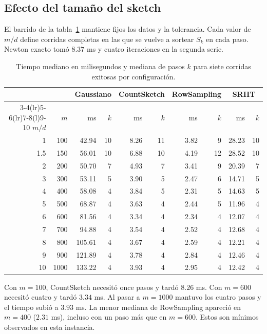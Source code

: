 \documentclass[11pt,a4paper]{article}
\begin{document}
\subsection{Efecto del tamaño del sketch}
El barrido de la tabla~\ref{tab:barrido} mantiene fijos los datos y la tolerancia. Cada valor de $m/d$ define corridas completas en las que se vuelve a sortear $S_k$ en cada paso. Newton exacto tomó $8.37$ ms y cuatro iteraciones en la segunda serie.
\begin{table}[htbp]\centering\small
\caption{Tiempo mediano en milisegundos y mediana de pasos $k$ para siete corridas exitosas por configuración.}\label{tab:barrido}
\begin{tabular}{@{}rr rr rr rr rr@{}}\toprule
& &\multicolumn{2}{c}{Gaussiano}&\multicolumn{2}{c}{CountSketch}&
\multicolumn{2}{c}{RowSampling}&\multicolumn{2}{c}{SRHT}\\
\cmidrule(lr){3-4}\cmidrule(lr){5-6}\cmidrule(lr){7-8}\cmidrule(l){9-10}
$m/d$ & $m$ & ms & $k$ & ms & $k$ & ms & $k$ & ms & $k$\\ \midrule
1 & 100 & 42.94 & 10 & 8.26 & 11 & 3.82 & 9 & 28.23 & 10 \\
1.5 & 150 & 56.01 & 10 & 6.88 & 10 & 4.19 & 12 & 28.52 & 10 \\
2 & 200 & 50.70 & 7 & 4.93 & 7 & 3.41 & 9 & 20.39 & 7 \\
3 & 300 & 53.11 & 5 & 3.90 & 5 & 2.47 & 6 & 14.71 & 5 \\
4 & 400 & 58.08 & 4 & 3.84 & 5 & 2.31 & 5 & 14.63 & 5 \\
5 & 500 & 68.87 & 4 & 3.63 & 4 & 2.44 & 5 & 11.96 & 4 \\
6 & 600 & 81.56 & 4 & 3.34 & 4 & 2.34 & 4 & 12.07 & 4 \\
7 & 700 & 94.88 & 4 & 3.54 & 4 & 2.52 & 4 & 12.68 & 4 \\
8 & 800 & 105.61 & 4 & 3.67 & 4 & 2.59 & 4 & 12.21 & 4 \\
9 & 900 & 121.89 & 4 & 3.78 & 4 & 2.84 & 4 & 12.46 & 4 \\
10 & 1000 & 133.22 & 4 & 3.93 & 4 & 2.95 & 4 & 12.42 & 4 \\
\bottomrule
\end{tabular}
\end{table}

Con $m=100$, CountSketch necesitó once pasos y tardó $8.26$ ms. Con $m=600$ necesitó cuatro y tardó $3.34$ ms. Al pasar a $m=1000$ mantuvo los cuatro pasos y el tiempo subió a $3.93$ ms. La menor mediana de RowSampling apareció en $m=400$ ($2.31$ ms), incluso con un paso más que en $m=600$. Estos son mínimos observados en esta instancia.
\end{document}
